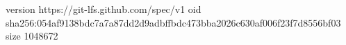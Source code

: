 version https://git-lfs.github.com/spec/v1
oid sha256:054af9138bdc7a7a87dd2d9adbffbdc473bba2026c630af006f23f7d8556bf03
size 1048672
